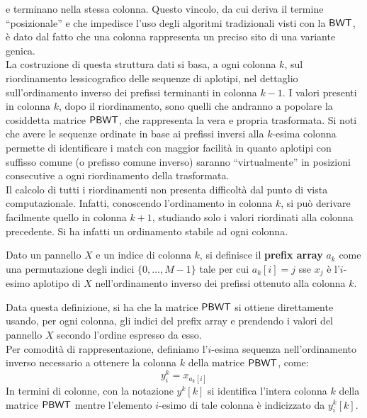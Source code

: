 e terminano nella stessa colonna. Questo vincolo,
da cui deriva il termine ``posizionale'' e che impedisce l'uso degli
algoritmi tradizionali visti con la $\mbox{\rm {\sf BWT}}$, è dato dal fatto che una
colonna rappresenta un preciso sito di una variante genica. \\
La costruzione di questa struttura dati si basa, a ogni colonna $k$, sul
riordinamento lessicografico delle sequenze di aplotipi, nel dettaglio
sull'ordinamento 
inverso dei prefissi terminanti in colonna $k-1$. I valori presenti in colonna
$k$, dopo il riordinamento, sono quelli che andranno a popolare
la cosiddetta matrice $\mbox{\rm {\sf PBWT}}$, che rappresenta la vera e propria
trasformata. Si noti che avere le sequenze 
ordinate in base ai prefissi inversi alla $k$-esima colonna permette di
identificare i match con maggior facilità in quanto aplotipi
con suffisso comune (o prefisso comune inverso) saranno ``virtualmente'' in
posizioni 
consecutive a ogni riordinamento della trasformata.\\
Il calcolo di tutti i riordinamenti non presenta difficoltà dal punto di
vista computazionale. Infatti, conoscendo l'ordinamento in colonna $k$, si può
derivare facilmente quello in colonna $k+1$, studiando solo i valori
riordinati alla colonna precedente. Si ha infatti un ordinamento stabile ad ogni
colonna. 
\begin{definizione}
  Dato un pannello $X$ e un indice di colonna
  $k$, si definisce il \textbf{prefix array} $a_k$ come una permutazione degli
  indici $\{0,\ldots, M-1\}$ tale per cui $a_k[i]=j$ sse $x_j$ è l'$i$-esimo
  aplotipo di 
  $X$ nell'ordinamento inverso dei prefissi ottenuto alla colonna $k$.
\end{definizione}
Data questa definizione, si ha che la matrice $\mbox{\rm {\sf PBWT}}$ si ottiene
direttamente usando, per ogni colonna, gli indici del prefix
  array e prendendo i valori del pannello $X$ secondo l'ordine espresso da
esso.\\ 
Per comodità di rappresentazione, definiamo l'$i$-esima sequenza
nell'ordinamento inverso necessario a ottenere la colonna $k$ della matrice
$\mbox{\rm {\sf PBWT}}$, come:
\begin{equation}
  \label{eq:pbwty}
  y_i^k=x_{a_k[i]}
\end{equation}
In termini di colonne, con la notazione
$y^k[k]$ si identifica l'intera colonna $k$ della matrice $\mbox{\rm {\sf PBWT}}$ mentre
l'elemento $i$-esimo di tale colonna è indicizzato da $y_i^k[k]$.\\
